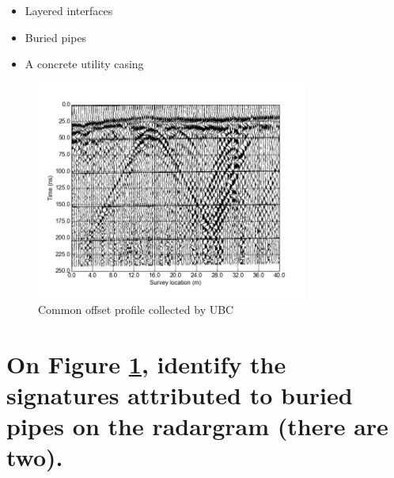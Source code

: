 \documentclass[twosides]{EOSC350Lab} %
\begin{document}




		\begin{itemize}
			\item Layered interfaces 
			\item Buried pipes
			\item A concrete utility casing
		\end{itemize}

		\begin{figure}[H]
			\centering \includegraphics[width=0.8\textwidth]{Figures/ubc_GPRdata_coord.png}
			\caption{Common offset profile collected by UBC}
			\label{fig:ubc_GPRdata_coord}
		\end{figure}



	\part{On Figure \ref{fig:ubc_GPRdata_coord}, identify the signatures attributed to buried pipes on the radargram (there are two).} 

\vspace{30pt}
\end{document}

